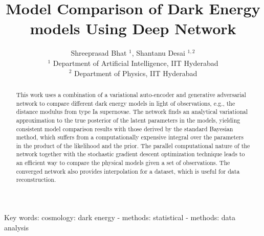 \documentclass[10pt]{article}
\title{Model Comparison of Dark Energy models Using Deep Network }
\author{Shreeprasad Bhat $^{1}$, Shantanu Desai $^{1,2}$\\
${ }^{1}$ Department of Artificial Intelligence, IIT Hyderabad\\
${ }^{2}$ Department of Physics, IIT Hyderabad}
\begin{document}
\maketitle

\begin{abstract}
This work uses a combination of a variational auto-encoder and generative adversarial network to compare different dark energy models in light of observations, e.g., the distance modulus from type Ia supernovae. The network finds an analytical variational approximation to the true posterior of the latent parameters in the models, yielding consistent model comparison results with those derived by the standard Bayesian method, which suffers from a computationally expensive integral over the parameters in the product of the likelihood and the prior. The parallel computational nature of the network together with the stochastic gradient descent optimization technique leads to an efficient way to compare the physical models given a set of observations. The converged network also provides interpolation for a dataset, which is useful for data reconstruction.
\end{abstract}

Key words: cosmology: dark energy - methods: statistical - methods: data analysis
\end{document}
